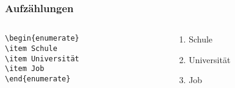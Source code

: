 \begin{frame}[fragile]
  \frametitle{Aufzählungen}

  \begin{Beispiel}
    \begin{columns}
      \begin{column}{0.4\linewidth}
\begin{lstlisting}
\begin{enumerate}
\item Schule
\item Universität
\item Job
\end{enumerate}
\end{lstlisting}
      \end{column}
      \begin{column}{0.4\linewidth}
        \begin{enumerate}[1. ]
        \item Schule
        \item Universität
        \item Job
        \end{enumerate}
      \end{column}
    \end{columns}
  \end{Beispiel}
\end{frame}


